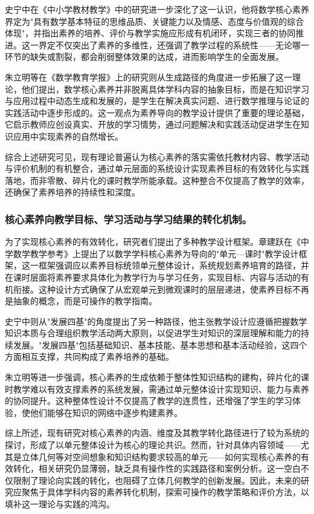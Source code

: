 \documentclass[UTF8,a4paper,12pt,twoside]{ctexart}
\begin{document}
史宁中\cite{shi2017}在《中小学教材教学》中的研究进一步深化了这一认识，他将数学核心素养界定为"具有数学基本特征的思维品质、关键能力以及情感、态度与价值观的综合体现"，并指出素养的培养、评价与教学实施应形成有机闭环，实现三者的协同推进。这一界定不仅突出了素养的多维性，还强调了教学过程的系统性——无论哪一环节的缺失或割裂，都会削弱整体效果的达成，进而影响学生的全面发展。

朱立明等\cite{zhu2018}在《数学教育学报》上的研究则从生成路径的角度进一步拓展了这一理论，他们提出，数学核心素养并非脱离具体学科内容的抽象目标，而是在知识学习与应用过程中动态生成和发展的，是学生在解决真实问题、进行数学推理与论证的实践活动中逐步形成的。这一观点为素养导向的教学设计提供了重要的理论基础，它启示教师应创设真实、开放的学习情势，通过问题解决和实践活动促进学生在知识应用中实现素养的自然增长。

综合上述研究可见，现有理论普遍认为核心素养的落实需依托教材内容、教学活动与评价机制的有机整合，通过单元层面的系统设计实现素养目标的有效转化与实践落地，而非零散、碎片化的课时教学所能承载。这种整合不仅提高了教学的效率，还确保了素养培养的持续性和深度。

\subsubsection{核心素养向教学目标、学习活动与学习结果的转化机制。}

为了实现核心素养的有效转化，研究者们提出了多种教学设计框架。章建跃\cite{zhang2020}在《中学数学教学参考》上提出了以数学学科核心素养为导向的"单元—课时"教学设计框架，这一框架强调应以素养目标统领单元整体设计，系统规划素养培育的路径，并在课时层面将素养要求具体化为教学行为与学习任务，实现目标、内容与活动的有机衔接。这种设计方式确保了从宏观单元到微观课时的层层递进，使素养目标不再是抽象的概念，而是可操作的教学指南。

史宁中\cite{shi2017}则从"发展四基"的角度提出了另一种路径，他主张教学设计应遵循把握数学知识本质与合理组织教学活动两大原则，以促进学生对知识的深层理解和能力的持续发展。"发展四基"包括基础知识、基本技能、基本思想和基本活动经验，这四个方面相互支撑，共同构成了素养培养的基础。

朱立明等\cite{zhu2018}进一步强调，核心素养的生成依赖于整体性知识结构的建构，碎片化的课时教学难以有效支撑素养的系统发展，需通过单元整体设计实现知识、能力与素养的协同提升。这种整体性设计不仅提高了教学的连贯性，还增强了学生的学习体验，使他们能够在知识的网络中逐步构建素养。

综上所述，现有研究对核心素养的内涵、维度及其教学转化路径进行了较为系统的探讨，形成了以单元整体设计为核心的理论共识。然而，针对具体内容领域——尤其是立体几何等对空间想象和知识结构要求较高的单元——如何实现核心素养的有效转化，相关研究仍显薄弱，缺乏具有操作性的实践路径和案例分析。这一空白不仅限制了理论向实践的转化，也阻碍了立体几何教学的创新发展。因此，未来的研究应聚焦于具体学科内容的素养转化机制，探索可操作的教学策略和评价方法，以填补这一理论与实践的鸿沟。
\end{document}

